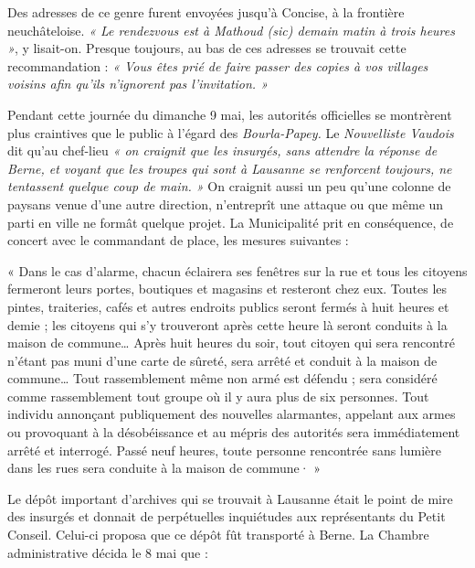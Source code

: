\documentclass[french,twoside]{book} %
\newenvironment{quoteblock}%
  {\begin{quoting}}
  {\end{quoting}}
\newenvironment{quotebar}{%
    \def\FrameCommand{{\color{rubric!10!}\vrule width 0.5em} \hspace{0.9em}}%
    \def\OuterFrameSep{\itemsep} %
    \MakeFramed {\advance\hsize-\width \FrameRestore}
  }%
  {%
    \endMakeFramed
  }
\renewenvironment{quoteblock}%
  {%
    \savenotes
    \setstretch{0.9}
    \begin{quotebar}
  }
  {%
    \end{quotebar}
    \spewnotes
  }
\begin{document}
\noindent Des adresses de ce genre furent envoyées jusqu’à Concise, à la frontière neuchâteloise. \emph{« Le rendezvous est à Mathoud \emph{(sic)} demain matin à trois heures »}, y lisait-on. Presque toujours, au bas de ces adresses se trouvait cette recommandation : \emph{« Vous êtes prié de faire passer des copies à vos villages voisins afin qu’ils n’ignorent pas l’invitation. »}\par
Pendant cette journée du dimanche 9 mai, les autorités officielles se montrèrent plus craintives que le public à l’égard des \emph{Bourla-Papey.} Le \emph{Nouvelliste Vaudois} dit qu’au chef-lieu \emph{« on craignit que les insurgés, sans attendre la réponse de Berne, et voyant que les troupes qui sont à Lausanne se renforcent toujours, ne tentassent quelque coup de main. »} On craignit aussi un peu qu’une colonne de paysans venue d’une autre direction, n’entreprît une attaque ou que même un parti en ville ne formât quelque projet. La Municipalité prit en conséquence, de concert avec le commandant de place, les mesures suivantes :\par

\begin{quoteblock}
 \noindent « Dans le cas d’alarme, chacun éclairera ses fenêtres sur la rue et tous les citoyens fermeront leurs portes, boutiques et magasins et resteront chez eux. Toutes les pintes, traiteries, cafés et autres endroits publics seront fermés à huit heures et demie ; les citoyens qui s’y trouveront après cette heure là seront conduits à la maison de commune… Après huit heures du soir, tout citoyen qui sera rencontré n’étant pas muni d’une carte de sûreté, sera arrêté et conduit à la maison de commune… Tout rassemblement même non armé est défendu ; sera considéré comme rassemblement tout groupe où il y aura plus de six personnes. Tout individu annonçant publiquement des nouvelles alarmantes, appelant aux armes ou provoquant à la désobéissance et au mépris des autorités sera immédiatement arrêté et interrogé. Passé neuf heures, toute personne rencontrée sans lumière dans les rues sera conduite à la maison de commune· »
 \end{quoteblock}

\noindent Le dépôt important d’archives qui se trouvait à Lausanne était le point de mire des insurgés et donnait de perpétuelles inquiétudes aux représentants du Petit Conseil. Celui-ci proposa que ce dépôt fût transporté à Berne. La Chambre administrative décida le 8 mai que :\par
\end{document}
